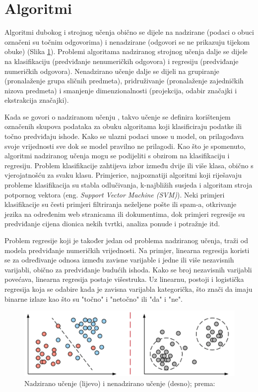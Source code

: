 \documentclass[]{foi} %
\begin{document}
\newpage
\section{Algoritmi}

Algoritmi dubokog i strojnog učenja \cite[str. 98-105]{deep} obično se dijele na nadzirane (podaci o obuci označeni su točnim odgovorima) i nenadzirane (odgovori se ne prikazuju tijekom obuke) (Slika \ref{fig:nvsnn}). Problemi algoritama nadziranog strojnog učenja dalje se dijele na klasifikaciju (predviđanje nenumeričkih odgovora) i regresiju (predviđanje numeričkih odgovora). Nenadzirano učenje dalje se dijeli na grupiranje (pronalaženje grupa sličnih predmeta), pridruživanje (pronalaženje zajedničkih nizova predmeta) i smanjenje dimenzionalnosti (projekcija, odabir značajki i ekstrakcija značajki).

Kada se govori o nadziranom učenju \cite{tds1}, takvo učenje se definira korištenjem označenih skupova podataka za obuku algoritama koji klasificiraju podatke ili točno predviđaju ishode. Kako se ulazni podaci unose u model, on prilagođava svoje vrijednosti sve dok se model pravilno ne prilagodi. Kao što je spomenuto, algoritmi nadziranog učenja mogu se podijeliti s obzirom na klasifikaciju i regresiju. Problem klasifikacije \cite{tds1} zahtijeva izbor između dvije ili više klasa, obično s vjerojatnošću za svaku klasu. Primjerice, najpoznatiji algoritmi \cite[str. 137]{deep} koji riješavaju probleme klasifikacija su stabla odlučivanja, k-najbližih susjeda i algoritam stroja potpornog vektora (eng. \textit{Support Vector Machine (SVM)}).
Neki primjeri \cite{tds2} klasifikacije su česti primjeri filtriranja neželjene pošte ili spam-a, otkrivanje jezika na određenim web stranicama ili dokumentima, dok primjeri regresije su predviđanje cijena dionica nekih tvrtki, analiza ponude i potražnje itd.

Problem regresije koji je također jedan od problema nadziranog učenja, traži od modela predviđanje numeričkih vrijednosti. Na primjer, linearna regresija \cite[str. 105, 106]{deep} koristi se za određivanje odnosa između zavisne varijable i jedne ili više nezavisnih varijabli, obično za predviđanje budućih ishoda. Kako se broj nezavisnih varijabli povećava, linearna regresija postaje višestruka. Uz linearnu, postoji i logistička regresija koja se odabire kada je zavisna varijabla kategorička, što znači da imaju binarne izlaze kao što su "točno" i "netočno" ili "da" i "ne".

\begin{figure}[!ht]
    \centering
    \includegraphics[width=1\textwidth]{slike/nvsnn.png}
    \caption{Nadzirano učenje (lijevo) i nenadzirano učenje (desno); prema: \cite{deep}}
    \label{fig:nvsnn}
\end{figure}
\end{document}

